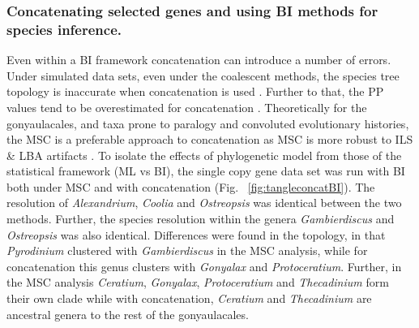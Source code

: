 \documentclass[12pt]{article}
\begin{document}
\subsubsection{Concatenating selected genes and using BI methods for species inference.}
\FloatBarrier
Even within a BI framework concatenation can introduce a number of errors. 
Under simulated data sets, even under the coalescent methods, the species tree topology is inaccurate when concatenation is used \cite{kubatko2007inconsistency}. 
Further to that, the PP values tend to be overestimated for concatenation \cite{suzuki2002overcredibility}. 
Theoretically for the gonyaulacales, and taxa prone to paralogy and convoluted evolutionary histories, the MSC is a preferable approach to concatenation as MSC is more robust to ILS \& LBA artifacts \cite{liu2014coalescent}. 
To isolate the effects of phylogenetic model from those of the statistical framework (ML vs BI), the single copy gene data set was run with BI both under MSC and with concatenation (Fig. ~\ref{fig:tangleconcatBI}). 
The resolution of \textit{Alexandrium}, \textit{Coolia} and \textit{Ostreopsis} was identical between the two methods. 
Further, the species resolution within the genera \textit{Gambierdiscus} and \textit{Ostreopsis} was also identical. 
Differences were found in the topology, in that \textit{Pyrodinium} clustered with \textit{Gambierdiscus} in the MSC analysis, while for concatenation this genus clusters with \textit{Gonyalax} and \textit{Protoceratium}. 
Further, in the MSC analysis \textit{Ceratium}, \textit{Gonyalax}, \textit{Protoceratium} and \textit{Thecadinium} form their own clade while with concatenation, \textit{Ceratium} and \textit{Thecadinium} are ancestral genera to the rest of the gonyaulacales. 
\end{document}
